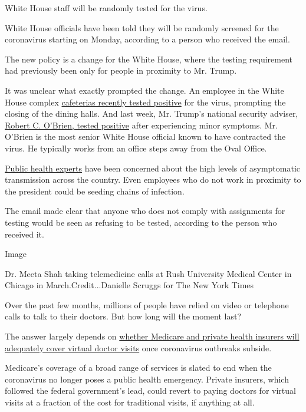 White House staff will be randomly tested for the virus.

White House officials have been told they will be randomly screened for
the coronavirus starting on Monday, according to a person who received
the email.

The new policy is a change for the White House, where the testing
requirement had previously been only for people in proximity to Mr.
Trump.

It was unclear what exactly prompted the change. An employee in the
White House complex
\href{https://www.nytimes.com/2020/07/22/us/politics/white-house-employee-covid-19.html}{cafeterias
recently tested positive} for the virus, prompting the closing of the
dining halls. And last week, Mr. Trump's national security adviser,
\href{https://www.nytimes.com/2020/07/27/us/politics/robert-obrien-virus.html}{Robert
C. O'Brien, tested positive} after experiencing minor symptoms. Mr.
O'Brien is the most senior White House official known to have contracted
the virus. He typically works from an office steps away from the Oval
Office.

\href{https://www.nytimes.com/2020/08/02/health/dr-birx-coronavirus-phase.html}{Public
health experts} have been concerned about the high levels of
asymptomatic transmission across the country. Even employees who do not
work in proximity to the president could be seeding chains of infection.

The email made clear that anyone who does not comply with assignments
for testing would be seen as refusing to be tested, according to the
person who received it.

Image

Dr. Meeta Shah taking telemedicine calls at Rush University Medical
Center in Chicago in March.Credit...Danielle Scruggs for The New York
Times

Over the past few months, millions of people have relied on video or
telephone calls to talk to their doctors. But how long will the moment
last?

The answer largely depends on
\href{https://www.nytimes.com/2020/08/03/health/covid-telemedicine-congress.html}{whether
Medicare and private health insurers will adequately cover virtual
doctor visits} once coronavirus outbreaks subside.

Medicare's coverage of a broad range of services is slated to end when
the coronavirus no longer poses a public health emergency. Private
insurers, which followed the federal government's lead, could revert to
paying doctors for virtual visits at a fraction of the cost for
traditional visits, if anything at all.

